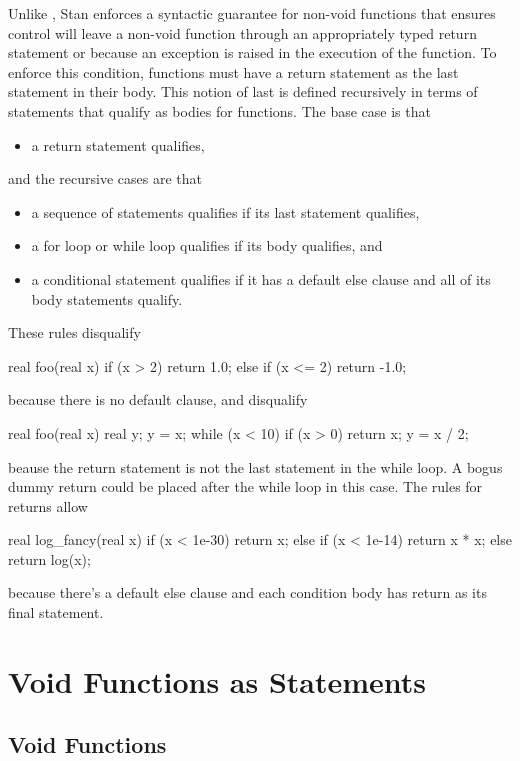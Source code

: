 Unlike \Cpp, Stan enforces a syntactic guarantee for non-void
functions that ensures control will leave a non-void function through
an appropriately typed return statement or because an exception is
raised in the execution of the function.  To enforce this condition,
functions must have a return statement as the last statement in their
body.  This notion of last is defined recursively in terms of
statements that qualify as bodies for functions.  The base case is that
%
\begin{itemize}
\item a return statement qualifies,
\end{itemize}
%
and the recursive cases are that
%
\begin{itemize}
\item a sequence of statements qualifies if its last statement
  qualifies,
\item a for loop or while loop qualifies if its body qualifies, and
\item a conditional statement qualifies if it has a default else
  clause and all of its body statements qualify.
\end{itemize}
%
These rules disqualify
%
\begin{stancode}
real foo(real x) {
  if (x > 2) return 1.0;
  else if (x <= 2) return -1.0;
}
\end{stancode}
%
because there is no default  clause, and
disqualify
%
\begin{stancode}
real foo(real x) {
  real y;
  y = x;
  while (x < 10) {
    if (x > 0) return x;
    y = x / 2;
  }
}
\end{stancode}
%
beause the return statement is not the last statement in the while
loop.  A bogus dummy return could be placed after the while loop in
this case.  The rules for returns allow
%
\begin{stancode}
real log_fancy(real x) {
  if (x < 1e-30)
    return x;
  else if (x < 1e-14)
    return x * x;
  else
    return log(x);
}
\end{stancode}
%
because there's a default else clause and each condition body has
return as its final statement.


\section{Void Functions as Statements}

\subsection{Void Functions}

